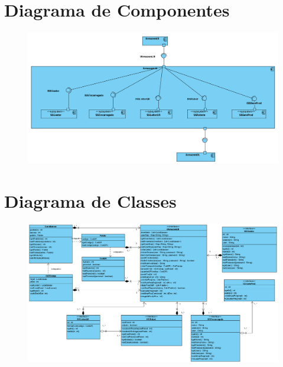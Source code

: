 \documentclass[a4paper]{report}
\begin{document}
    
\appendix
    \chapter{Diagrama de Componentes}
        \begin{figure}[H]
            \includegraphics[scale=0.40, center]{images/componentDiagram.png}
            \caption{}
        \end{figure}

    \chapter{Diagrama de Classes}
        \begin{figure}[H]
            \includegraphics[scale=0.60, center]{images/ClassDiagram.png}
            \caption{}
        \end{figure}
\end{document}
